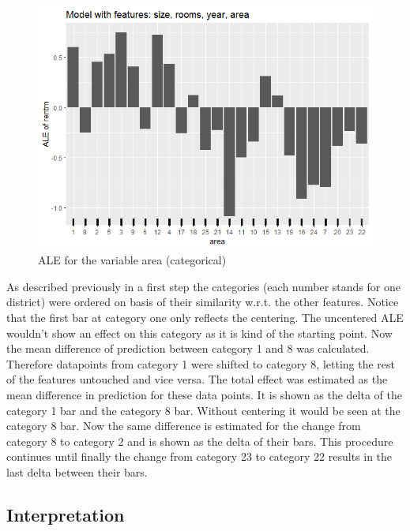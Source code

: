\documentclass[]{krantz}
\begin{document}
\begin{figure}
\includegraphics[width=1\linewidth]{images/ALE_2_example_cat_} \caption{ALE for the variable area (categorical)}\label{fig:ALE2catfullmod}
\end{figure}



As described previously in a first step the categories (each number
stands for one district) were ordered on basis of their similarity
w.r.t. the other features. Notice that the first bar at category one
only reflects the centering. The uncentered ALE wouldn't show an effect
on this category as it is kind of the starting point. Now the mean
difference of prediction between category 1 and 8 was calculated.
Therefore datapoints from category 1 were shifted to category 8, letting
the rest of the features untouched and vice versa. The total effect was
estimated as the mean difference in prediction for these data points. It
is shown as the delta of the category 1 bar and the category 8 bar.
Without centering it would be seen at the category 8 bar. Now the same
difference is estimated for the change from category 8 to category 2 and
is shown as the delta of their bars. This procedure continues until
finally the change from category 23 to category 22 results in the last
delta between their bars.

\subsection{Interpretation}\label{interpretation}
\end{document}
